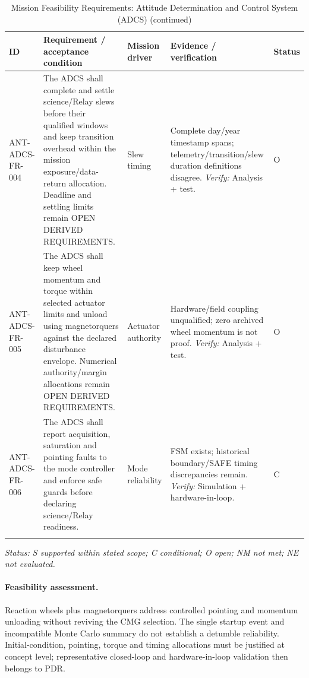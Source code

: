 \begin{table}[H]\centering\small\setlength{\tabcolsep}{3pt}
\ContinuedFloat\captionsetup{list=no}
\caption{Mission Feasibility Requirements: Attitude Determination and Control System (ADCS) (continued)}
\begin{tabular}{@{}
>{\RaggedRight\arraybackslash}p{}
>{\RaggedRight\arraybackslash}p{}
>{\RaggedRight\arraybackslash}p{}
>{\RaggedRight\arraybackslash}p{}
>{\RaggedRight\arraybackslash}p{}
@{}}
\toprule ID & Requirement / acceptance condition & Mission driver & Evidence / verification & Status\\\midrule
{}\label{req:ANT-ADCS-FR-004}\mbox{ANT-ADCS-}\newline\mbox{FR-004} & The ADCS shall complete and settle science/Relay slews before their qualified windows and keep transition overhead within the mission exposure/data-return allocation. Deadline and settling limits remain OPEN DERIVED REQUIREMENTS. & Slew timing & Complete day/year timestamp spans; telemetry/transition/slew duration definitions disagree. \emph{Verify:} Analysis + test. & O\\
\addlinespace[3pt]
\label{req:ANT-ADCS-FR-005}\mbox{ANT-ADCS-}\newline\mbox{FR-005} & The ADCS shall keep wheel momentum and torque within selected actuator limits and unload using magnetorquers against the declared disturbance envelope. Numerical authority/margin allocations remain OPEN DERIVED REQUIREMENTS. & Actuator authority & Hardware/field coupling unqualified; zero archived wheel momentum is not proof. \emph{Verify:} Analysis + test. & O\\
\addlinespace[3pt]
\label{req:ANT-ADCS-FR-006}\mbox{ANT-ADCS-}\newline\mbox{FR-006} & The ADCS shall report acquisition, saturation and pointing faults to the mode controller and enforce safe guards before declaring science/Relay readiness. & Mode reliability & FSM exists; historical boundary/SAFE timing discrepancies remain. \emph{Verify:} Simulation + hardware-in-loop. & C\\
\addlinespace[3pt]
\bottomrule
\end{tabular}
\end{table}
\textit{Status: S supported within stated scope; C conditional; O open; NM not met; NE not evaluated.}
\paragraph{Feasibility assessment.} Reaction wheels plus magnetorquers address controlled pointing and momentum unloading without reviving the CMG selection. The single startup event and incompatible Monte Carlo summary do not establish a detumble reliability. Initial-condition, pointing, torque and timing allocations must be justified at concept level; representative closed-loop and hardware-in-loop validation then belongs to PDR.
